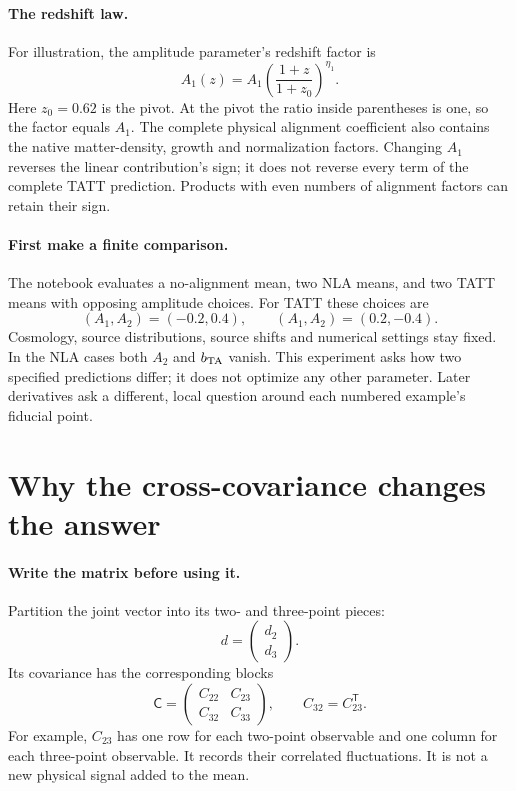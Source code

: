 \documentclass[11pt]{article}
\newcommand{\Cov}{\mathsf C}
\newcommand{\T}{^{\mathsf T}}
\begin{document}
\paragraph{The redshift law.}
For illustration, the amplitude parameter's redshift factor is
\begin{equation}
 A_1(z)=A_1\left(\frac{1+z}{1+z_0}\right)^{\eta_1}.
\end{equation}
Here $z_0=0.62$ is the pivot. At the pivot the ratio inside parentheses is
one, so the factor equals $A_1$. The complete physical alignment coefficient
also contains the native matter-density, growth and normalization factors.
Changing $A_1$ reverses the linear contribution's sign; it does not reverse
every term of the complete TATT prediction. Products with even numbers of
alignment factors can retain their sign.

\paragraph{First make a finite comparison.}
The notebook evaluates a no-alignment mean, two NLA means, and two TATT
means with opposing amplitude choices. For TATT these choices are
\begin{equation}
 (A_1,A_2)=(-0.2,0.4),\qquad (A_1,A_2)=(0.2,-0.4).
\end{equation}
Cosmology, source distributions, source shifts and numerical settings stay
fixed. In the NLA cases both $A_2$ and $b_{\rm TA}$ vanish. This experiment
asks how two specified predictions differ; it does not optimize any other
parameter. Later derivatives ask a different, local question around each
numbered example's fiducial point.

\section{Why the cross-covariance changes the answer}
\paragraph{Write the matrix before using it.}
Partition the joint vector into its two- and three-point pieces:
\begin{equation}
 d=\begin{pmatrix}d_2\\d_3\end{pmatrix}.
\end{equation}
Its covariance has the corresponding blocks
\begin{equation}
 \Cov=\begin{pmatrix}C_{22}&C_{23}\\C_{32}&C_{33}\end{pmatrix},
 \qquad C_{32}=C_{23}\T.
\end{equation}
For example, $C_{23}$ has one row for each two-point observable and one
column for each three-point observable. It records their correlated
fluctuations. It is not a new physical signal added to the mean.
\end{document}
